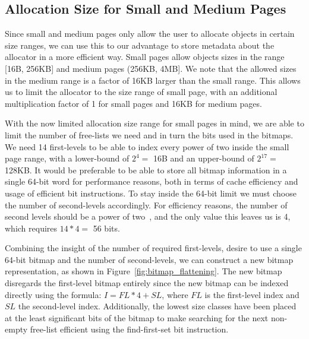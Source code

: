 
\subsection{Allocation Size for Small and Medium Pages}

Since small and medium pages only allow the user to allocate objects in certain size ranges, we can use this to our advantage to store metadata about the allocator in a more efficient way. Small pages allow objects sizes in the range [16B, 256KB] and medium pages (256KB, 4MB]. We note that the allowed sizes in the medium range is a factor of 16KB larger than the small range. This allows us to limit the allocator to the size range of small page, with an additional multiplication factor of 1 for small pages and 16KB for medium pages.

With the now limited allocation size range for small pages in mind, we are able to limit the number of free-lists we need and in turn the bits used in the bitmaps. We need 14 first-levels to be able to index every power of two inside the small page range, with a lower-bound of $2^4 =$ 16B and an upper-bound of $2^{17} =$ 128KB. It would be preferable to be able to store all bitmap information in a single 64-bit word for performance reasons, both in terms of cache efficiency and usage of efficient bit instructions. To stay inside the 64-bit limit we must choose the number of second-levels accordingly. For efficiency reasons, the number of second levels should be a power of two~\cite{tlsf}, and the only value this leaves us is 4, which requires $14 * 4 =$ 56 bits.

Combining the insight of the number of required first-levels, desire to use a single 64-bit bitmap and the number of second-levels, we can construct a new bitmap representation, as shown in Figure~\ref{fig:bitmap_flattening}. The new bitmap disregards the first-level bitmap entirely since the new bitmap can be indexed directly using the formula: $I = FL * 4 + SL$, where $FL$ is the first-level index and $SL$ the second-level index. Additionally, the lowest size classes have been placed at the least significant bits of the bitmap to make searching for the next non-empty free-list efficient using the find-first-set bit instruction.

